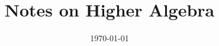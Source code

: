 \pagestyle{scrheadings}
\clearscrheadfoot

\ifoot{\VARname}
\cfoot{\pagemark}
\ofoot{\today}

\title{\Large Notes on Higher Algebra}
\author{\VARname}
\date{\today}

\maketitle